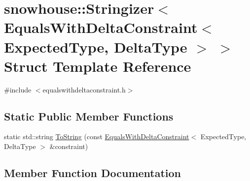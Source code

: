 \hypertarget{structsnowhouse_1_1Stringizer_3_01EqualsWithDeltaConstraint_3_01ExpectedType_00_01DeltaType_01_4_01_4}{}\section{snowhouse\+::Stringizer$<$ Equals\+With\+Delta\+Constraint$<$ Expected\+Type, Delta\+Type $>$ $>$ Struct Template Reference}
\label{structsnowhouse_1_1Stringizer_3_01EqualsWithDeltaConstraint_3_01ExpectedType_00_01DeltaType_01_4_01_4}


{\ttfamily \#include $<$equalswithdeltaconstraint.\+h$>$}

\subsection*{Static Public Member Functions}
\begin{DoxyCompactItemize}
\item 
static std\+::string \mbox{\hyperlink{structsnowhouse_1_1Stringizer_3_01EqualsWithDeltaConstraint_3_01ExpectedType_00_01DeltaType_01_4_01_4_ab4052b44001325a86e0968d5b70d1928}{To\+String}} (const \mbox{\hyperlink{structsnowhouse_1_1EqualsWithDeltaConstraint}{Equals\+With\+Delta\+Constraint}}$<$ Expected\+Type, Delta\+Type $>$ \&constraint)
\end{DoxyCompactItemize}


\subsection{Member Function Documentation}
\mbox{\label{structsnowhouse_1_1Stringizer_3_01EqualsWithDeltaConstraint_3_01ExpectedType_00_01DeltaType_01_4_01_4_ab4052b44001325a86e0968d5b70d1928}} 

